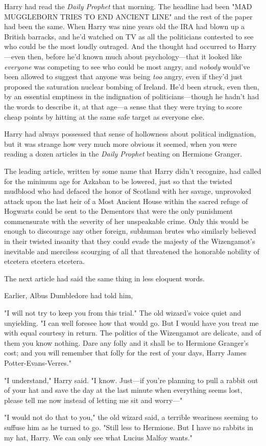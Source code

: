 Harry had read the \emph{Daily Prophet} that morning. The headline had been 
"MAD MUGGLEBORN TRIES TO END ANCIENT LINE" and the rest of the paper had been 
the same. When Harry was nine years old the IRA had blown up a British 
barracks, and he'd watched on TV as all the politicians contested to see who 
could be the most loudly outraged. And the thought had occurred to Harry---even 
then, before he'd known much about psychology---that it looked like 
\emph{everyone} was competing to see who could be most angry, and \emph{nobody} 
would've been allowed to suggest that anyone was being \emph{too} angry, even 
if they'd just proposed the saturation nuclear bombing of Ireland. He'd been 
struck, even then, by an essential emptiness in the indignation of 
politicians---though he hadn't had the words to describe it, at that age---a 
sense that they were trying to score cheap points by hitting at the same safe 
target as everyone else.

Harry had always possessed that sense of hollowness about political 
indignation, but it was strange how very much more obvious it seemed, when you 
were reading a dozen articles in the \emph{Daily Prophet} beating on Hermione 
Granger.

The leading article, written by some name that Harry didn't recognize, had 
called for the minimum age for Azkaban to be lowered, just so that the twisted 
mudblood who had defaced the honor of Scotland with her savage, unprovoked 
attack upon the last heir of a Most Ancient House within the sacred refuge of 
Hogwarts could be sent to the Dementors that were the only punishment 
commensurate with the severity of her unspeakable crime. Only this would be 
enough to discourage any other foreign, subhuman brutes who similarly believed 
in their twisted insanity that they could evade the majesty of the Wizengamot's 
inevitable and merciless scourging of all that threatened the honorable 
nobility of etcetera etcetera etcetera.

The next article had said the same thing in less eloquent words.

Earlier, Albus Dumbledore had told him,

\begin{em}
"I will not try to keep you from this trial." The old wizard's voice 
quiet and unyielding. "I can well foresee how that would go. But I would have 
you treat me with equal courtesy in return. The politics of the Wizengamot are 
delicate, and of them you know nothing. Dare any folly and it shall be to 
Hermione Granger's cost; and you will remember that folly for the rest of your 
days, Harry James Potter-Evans-Verres."

"I understand," Harry said. "I know. Just---if you're planning to pull a 
rabbit out of your hat and save the day at the last minute when everything 
seems lost, please tell me now instead of letting me sit and worry---"

"I would not do that to you," the old wizard said, a terrible weariness 
seeming to suffuse him as he turned to go. "Still less to Hermione. But I have 
no rabbits in my hat, Harry. We can only see what Lucius Malfoy wants."
\end{em}

